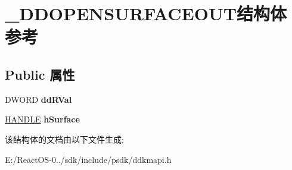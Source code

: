 \hypertarget{struct___d_d_o_p_e_n_s_u_r_f_a_c_e_o_u_t}{}\section{\+\_\+\+D\+D\+O\+P\+E\+N\+S\+U\+R\+F\+A\+C\+E\+O\+U\+T结构体 参考}
\label{struct___d_d_o_p_e_n_s_u_r_f_a_c_e_o_u_t}
\subsection*{Public 属性}
\begin{DoxyCompactItemize}
\item 
\mbox{\label{struct___d_d_o_p_e_n_s_u_r_f_a_c_e_o_u_t_ac411570015d377bf1a85f23ab0ee444c}} 
D\+W\+O\+RD {\bfseries dd\+R\+Val}
\item 
\mbox{\label{struct___d_d_o_p_e_n_s_u_r_f_a_c_e_o_u_t_ad0a00b55967fe2fece38778b8722c947}} 
\hyperlink{interfacevoid}{H\+A\+N\+D\+LE} {\bfseries h\+Surface}
\end{DoxyCompactItemize}


该结构体的文档由以下文件生成\+:\begin{DoxyCompactItemize}
\item 
E\+:/\+React\+O\+S-\/0../sdk/include/psdk/ddkmapi.\+h\end{DoxyCompactItemize}
